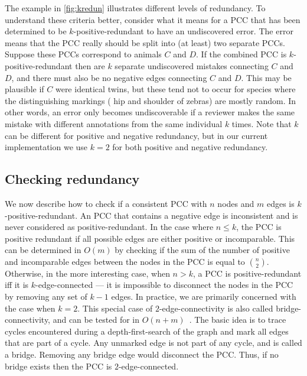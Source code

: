 The example in \cref{fig:kredun} illustrates different levels of redundancy.
To understand these criteria better, consider what it means for a PCC that has been determined to be
  $k$-positive-redundant to have an undiscovered error.
The error means that the PCC really should be split into (at least) two separate PCCs.
Suppose these PCCs correspond to animals $C$ and $D$.
If the combined PCC is $k$-positive-redundant then are $k$ separate undiscovered mistakes connecting $C$ and $D$,
  and there must also be no negative edges connecting $C$ and $D$.
This may be plausible if $C$ were identical twins, but these tend not to occur for species where the
  distinguishing markings (\eg{} hip and shoulder of zebras) are mostly random.
In other words, an error only becomes undiscoverable if a reviewer makes the same mistake with different
  annotations from the same individual $k$ times.
Note that $k$ can be different for positive and negative redundancy, but in our current implementation we use
  $k=2$ for both positive and negative redundancy.


\subsection{Checking redundancy}

We now describe how to check if a consistent PCC with $n$ nodes and $m$ edges is $k$-positive-redundant.
An PCC that contains a negative edge is inconsistent and is never considered as positive-redundant.
In the case where $n \leq k$, the PCC is positive redundant if all possible edges are either positive or
  incomparable.
This can be determined in $O(m)$ by checking if the sum of the number of positive and incomparable edges between
  the nodes in the PCC is equal to $\binom{n}{2}$.
Otherwise, in the more interesting case, when $n > k$, a PCC is positive-redundant iff it is $k$-edge-connected
  --- \ie{} it is impossible to disconnect the nodes in the PCC by removing any set of $k - 1$ edges.
In practice, we are primarily concerned with the case when $k=2$.
This special case of $2$-edge-connectivity is also called bridge-connectivity, and can be tested for in %
$O(n + m)$~\cite{eswaran_augmentation_1976,wang_simple_2015}.
The basic idea is to trace cycles encountered during a depth-first-search of the graph and mark all edges that
  are part of a cycle.
Any unmarked edge is not part of any cycle, and is called a bridge.
Removing any bridge edge would disconnect the PCC.
Thus, if no bridge exists then the PCC is $2$-edge-connected.

